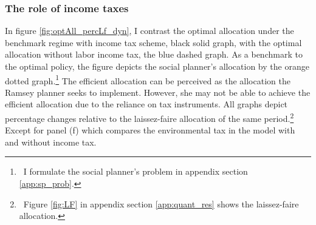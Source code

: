 

\subsubsection{The role of income taxes}\label{subsec:notaul}



In figure \ref{fig:optAll_percLf_dyn}, I contrast the optimal allocation under the benchmark regime with income tax scheme, black solid graph, with the optimal allocation without labor income tax, the blue dashed graph. As a benchmark to the optimal policy, the figure depicts the social planner's allocation by the orange dotted graph.\footnote{\ I formulate the social planner's problem in appendix section \ref{app:sp_prob}.} 
The efficient allocation can be perceived as the allocation the Ramsey planner seeks to implement. However, she may not be able to achieve the efficient allocation due to the reliance on tax instruments.
All graphs depict percentage changes relative to the laissez-faire allocation of the same period.\footnote{\ Figure \ref{fig:LF} in appendix section \ref{app:quant_res} shows the laissez-faire allocation. } Except for panel (f) which compares the environmental tax in the model with and without income tax. 

